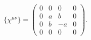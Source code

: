 \begin{equation}
 \{\chi^{\mu\nu}\} = \left(
\begin{array}{cccc}
0 & 0 & 0 & 0\\
0 & a & b & 0 \\
0 & b & -a & 0 \\
0 & 0 & 0 & 0
\end{array}
\right).
\label{53}
\end{equation}

